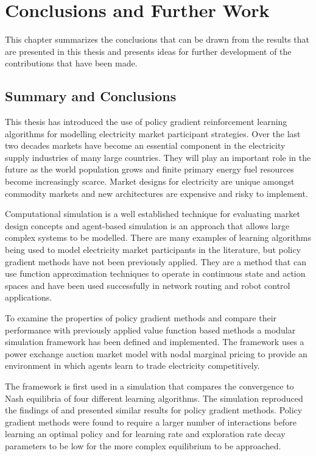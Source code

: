 \chapter{Conclusions and Further Work}
\label{ch:conclusion}
This chapter summarizes the conclusions that can be drawn from the
results that are presented in this thesis and presents ideas for
further development of the contributions that have been made.

\section{Summary and Conclusions}
This thesis has introduced the use of policy gradient reinforcement learning
algorithms for modelling electricity market participant strategies.  Over the
last two decades markets have become an essential component in the electricity
supply industries of many large countries.  They will play an important role in
the future as the world population grows and finite primary energy fuel
resources become increasingly scarce.  Market designs for electricity are
unique amongst commodity markets and new architectures are expensive and risky to
implement.

Computational simulation is a well established technique for evaluating market
design concepts and agent-based simulation is an approach that allows large
complex systems to be modelled.  There are many examples of learning algorithms
being used to model electricity market participants in the literature, but
policy gradient methods have not been previously applied.  They are a method
that can use function approximation techniques to operate in continuous state
and action spaces and have been used successfully in network routing and robot
control applications.

To examine the properties of policy gradient methods and compare their
performance with previously applied value function based methods a modular
simulation framework has been defined and implemented.  The framework uses a
power exchange auction market model with nodal marginal pricing to provide an
environment in which agents learn to trade electricity competitively.

The framework is first used in a simulation that compares the convergence to
Nash equilibria of four different learning algorithms.  The simulation
reproduced the findings of  and presented similar results
for policy gradient methods.  Policy gradient methods were found to require a
larger number of interactions before learning an optimal policy and for learning
rate and exploration rate decay parameters to be low for the more complex
equilibrium to be approached.

